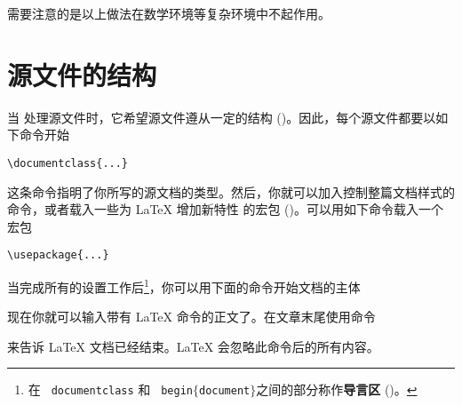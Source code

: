需要注意的是以上做法在数学环境等复杂环境中不起作用。

\section{源文件的结构}\label{inputfilestructure}


当 \LaTeXe{} 处理源文件时，它希望源文件遵从一定的结构 ()。因此，每个源文件都要以如下命令开始
\begin{code}
\verb|\documentclass{...}|
\end{code}
这条命令指明了你所写的源文档的类型。然后，你就可以加入控制整篇文档样式的命令，或者载入一些为 \LaTeX{} 增加新特性
的宏包 ()。可以用如下命令载入一个宏包
\begin{code}
\verb|\usepackage{...}|
\end{code}


当完成所有的设置工作后\footnote{在 \texttt{\bs
    documentclass} 和 \texttt{\bs
    begin$\mathtt{\{}$document$\mathtt{\}}$}之间的部分称作\textbf{导言区} ()。}，你可以用下面的命令开始文档的主体
\begin{code}
\verb||
\end{code}


现在你就可以输入带有 \LaTeX{} 命令的正文了。在文章末尾使用命令
\begin{code}
\verb||
\end{code}
来告诉 \LaTeX{} 文档已经结束。\LaTeX{} 会忽略此命令后的所有内容。

